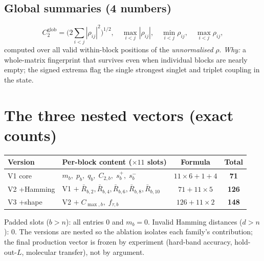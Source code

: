 \documentclass[11pt]{article}
\begin{document}
\subsection{Global summaries (4 numbers)}
\[
  C_2^{\mathrm{glob}}=\Big(2\!\!\sum_{i<j}|\rho_{ij}|^2\Big)^{1/2},\quad
  \max_{i<j}|\rho_{ij}|,\quad
  \min_{i<j}\rho_{ij},\quad
  \max_{i<j}\rho_{ij},
\]
computed over all valid within-block positions of the \emph{unnormalised}
$\rho$. \emph{Why:} a whole-matrix fingerprint that survives even when
individual blocks are nearly empty; the signed extrema flag the single
strongest singlet and triplet coupling in the state.

\section{The three nested vectors (exact counts)}
\begin{center}
\begin{tabular}{@{}llcc@{}}
\toprule
Version & Per-block content ($\times11$ slots) & Formula & Total \\
\midrule
V1 core     & $m_b,\;p_b,\;q_b,\;C_{2,b},\;s^{+}_b,\;s^{-}_b$
            & $11\times6+1+4$ & \textbf{71} \\
V2 +Hamming & V1 $+\;\bar R_{b,2},\bar R_{b,4},\bar R_{b,6},
              \bar R_{b,8},\bar R_{b,10}$
            & $71+11\times5$ & \textbf{126} \\
V3 +shape   & V2 $+\;C_{\max,b},\;f_{\tau,b}$
            & $126+11\times2$ & \textbf{148} \\
\bottomrule
\end{tabular}
\end{center}
Padded slots ($b>n$): all entries $0$ and $m_b=0$. Invalid Hamming distances
($d>n$): $0$. The versions are nested so the ablation isolates each family's
contribution; the final production vector is frozen by experiment (hard-band
accuracy, hold-out-$L$, molecular transfer), not by argument.

\end{document}
